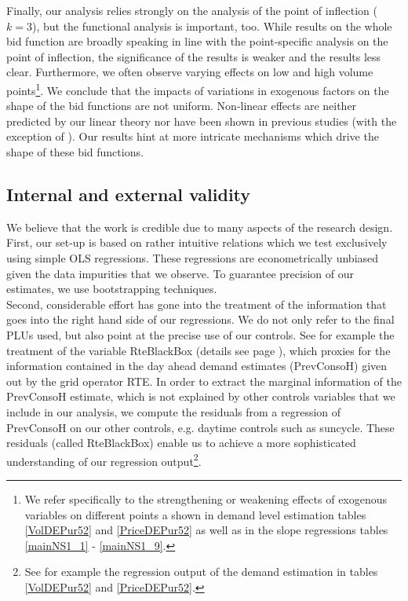

Finally, our analysis relies strongly on the analysis of the point of inflection ($k=3$), but the functional analysis is important, too. While results on the whole bid function are broadly speaking in line with the point-specific analysis on the point of inflection, the significance of the results is weaker and the results less clear. Furthermore, we often observe varying effects on low and high volume points\footnote{We refer specifically to the strengthening or weakening effects of exogenous variables on different points a shown in demand level estimation tables \ref{VolDEPur52} and \ref{PriceDEPur52}  as well as in the slope regressions tables \ref{mainNS1_1} - \ref{mainNS1_9}.}.
We conclude that the impacts of variations in exogenous factors on the shape of the bid functions are not uniform. Non-linear effects are neither predicted by our linear theory nor have been shown in previous studies (with the exception of \cite{wolfram1999measuring}). Our results hint at more intricate mechanisms which drive the shape of these bid functions. 


\subsection{Internal and external validity}
\label{internal}

We believe that the work is credible due to many aspects of the research design. \\

First, our set-up is based on rather intuitive relations which we test exclusively using simple OLS regressions. These regressions are econometrically unbiased given the data impurities that we observe. To guarantee precision of our estimates, we use bootstrapping techniques.\\ 

Second, considerable effort has gone into the treatment of the information that goes into the right hand side of our regressions. We do not only refer to the final PLUs used, but also point at the precise use of our controls. See for example the treatment of the variable RteBlackBox (details see page \pageref{RteBlackBox}), which proxies for the information contained in the day ahead demand estimates (PrevConsoH) given out by the grid operator RTE. In order to extract the marginal information of the PrevConsoH estimate, which is not explained by other controls variables that we include in our analysis, we compute the residuals from a regression of PrevConsoH on our other controls, e.g. daytime controls such as suncycle. These residuals (called RteBlackBox) enable us to achieve a more sophisticated understanding of our regression output\footnote{See for example the regression output of the demand estimation in tables \ref{VolDEPur52} and \ref{PriceDEPur52}.}.\\

